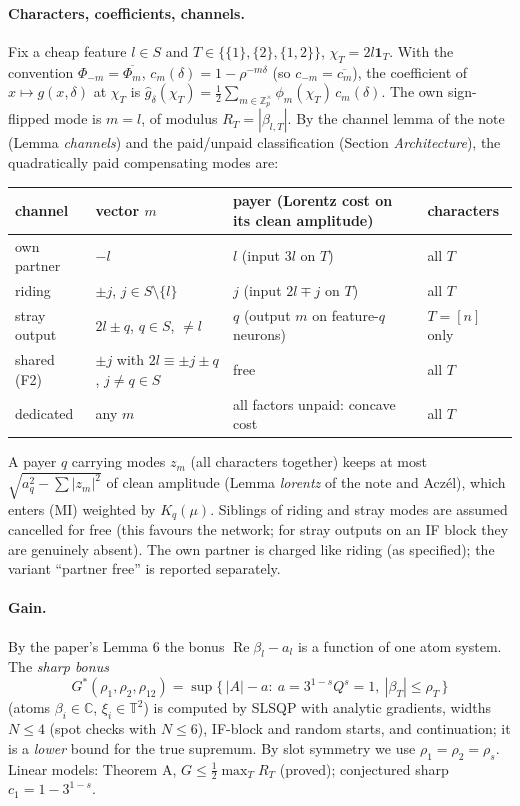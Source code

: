 \documentclass[11pt]{article}
\theoremstyle{definition}
\renewcommand{\Re}{\operatorname{Re}}
\begin{document}
\paragraph{Characters, coefficients, channels.}  Fix a cheap feature $l\in S$ and $T\in\{\{1\},\{2\},\{1,2\}\}$, $\chi_T=2l\mathbf 1_T$.
With the convention $\Phi_{-m}=\overline{\Phi_m}$, $c_m(\delta)=1-\rho^{-m\delta}$ (so $c_{-m}=\overline{c_m}$), the coefficient of $x\mapsto g(x,\delta)$ at
$\chi_T$ is $\hat g_\delta(\chi_T)=\frac12\sum_{m\in\mathbb Z_p^\times}\phi_m(\chi_T)\,c_m(\delta)$.  The own sign-flipped mode is $m=l$, of modulus
$R_T=|\beta_{l,T}|$.  By the channel lemma of the note (Lemma \emph{channels}) and the paid/unpaid classification (Section \emph{Architecture}), the
quadratically paid compensating modes are:
\begin{center}\small
\begin{tabular}{llll}
\toprule
channel & vector $m$ & payer (Lorentz cost on its clean amplitude) & characters\\
\midrule
own partner & $-l$ & $l$ (input $3l$ on $T$) & all $T$\\
riding & $\pm j$, $j\in S\setminus\{l\}$ & $j$ (input $2l\mp j$ on $T$) & all $T$\\
stray output & $2l\pm q$, $q\in S$, $\ne l$ & $q$ (output $m$ on feature-$q$ neurons) & $T=[n]$ only\\
shared (F2) & $\pm j$ with $2l\equiv\pm j\pm q$, $j\ne q\in S$ & free & all $T$\\
dedicated & any $m$ & all factors unpaid: concave cost & all $T$\\
\bottomrule
\end{tabular}
\end{center}
A payer $q$ carrying modes $z_{m}$ (all characters together) keeps at most $\sqrt{a_q^2-\sum|z_m|^2}$ of clean amplitude (Lemma \emph{lorentz} of the
note and Acz\'el), which enters (MI) weighted by $K_q(\mu)$.  Siblings of riding and stray modes are assumed cancelled for free (this favours the
network; for stray outputs on an IF block they are genuinely absent).  The own partner is charged like riding (as specified); the variant
``partner free'' is reported separately.

\paragraph{Gain.}  By the paper's Lemma 6 the bonus $\Re\beta_l-a_l$ is a function of one atom system.  The \emph{sharp bonus}
\[G^*(\rho_1,\rho_2,\rho_{12})=\sup\{\,|A|-a:\ a=3^{1-s}Q^s=1,\ |\beta_T|\le\rho_T\,\}\]
(atoms $\beta_i\in\mathbb C$, $\xi_i\in\mathbb T^2$) is computed by SLSQP with analytic gradients, widths $N\le4$ (spot checks with $N\le6$),
IF-block and random starts, and continuation; it is a \emph{lower} bound for the true supremum.  By slot symmetry we use $\rho_1=\rho_2=\rho_s$.
Linear models: Theorem A, $G\le\frac12\max_TR_T$ (proved); conjectured sharp $c_1=1-3^{1-s}$.
\end{document}
